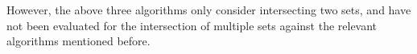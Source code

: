 %
%
%
However, the above three algorithms only consider intersecting two sets, and have not been evaluated for the intersection of multiple sets against the relevant algorithms mentioned before.

